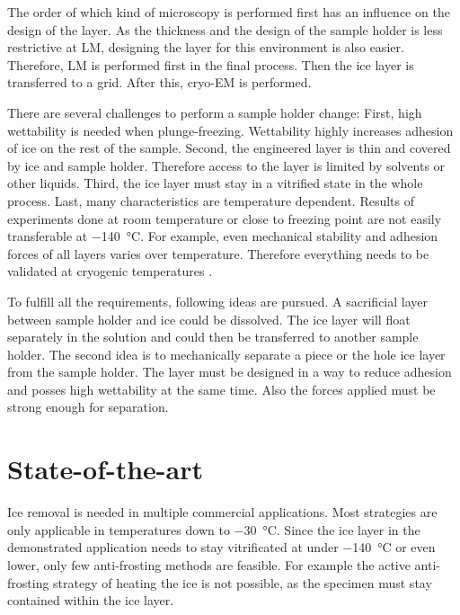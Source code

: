 The order of which kind of microscopy is performed first has an influence on the design of the layer. As the thickness and the design of the sample holder is less restrictive at LM, designing the layer for this environment is also easier. Therefore, LM is performed first in the final process. Then the ice layer is transferred to a grid. After this, cryo-EM is performed.

There are several challenges to perform a sample holder change: First, high wettability is needed when plunge-freezing. Wettability highly increases adhesion of ice on the rest of the sample. Second, the engineered layer is thin and covered by ice and sample holder. Therefore access to the layer is limited by solvents or other liquids. Third, the ice layer must stay in a vitrified state in the whole process. Last, many characteristics are temperature dependent. Results of experiments done at room temperature or close to freezing point are not easily transferable at \SI{-140}{\degreeCelsius}. For example, even mechanical stability and adhesion forces of all layers varies over temperature. Therefore everything needs to be validated at cryogenic temperatures \cite{Makkonen.2012}.

To fulfill all the requirements, following ideas are pursued. A sacrificial layer between sample holder and ice could be dissolved. The ice layer will float separately in the solution and could then be transferred to another sample holder. The second idea is to mechanically separate a piece or the hole ice layer from the sample holder. The layer must be designed in a way to reduce adhesion and posses high wettability at the same time. Also the forces applied must be strong enough for separation.


\section{State-of-the-art}
\label{section:Stateoftheart}

Ice removal is needed in multiple commercial applications. Most strategies are only applicable in temperatures down to \SI{-30}{\degreeCelsius}. Since the ice layer in the demonstrated application needs to stay vitrificated at under \SI{-140}{\degreeCelsius} or even lower, only few anti-frosting methods are feasible. For example the active anti-frosting strategy of heating the ice is not possible, as the specimen must stay contained within the ice layer.

